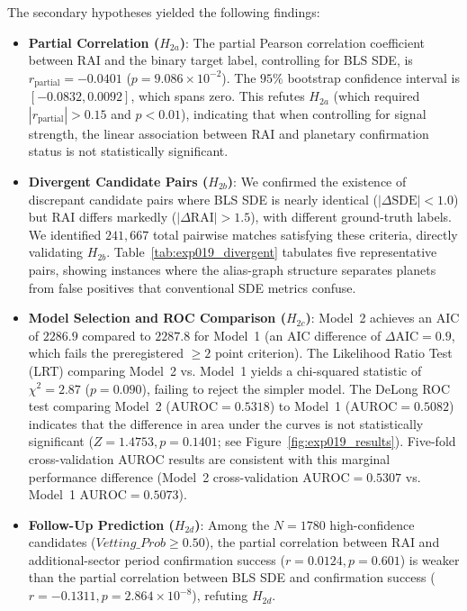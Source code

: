 The secondary hypotheses yielded the following findings:
\begin{itemize}
\item \textbf{Partial Correlation ($H_{2a}$)}: The partial Pearson correlation coefficient between RAI and the binary target label, controlling for BLS SDE, is $r_{\text{partial}} = -0.0401$ ($p = 9.086 \times 10^{-2}$). The $95\%$ bootstrap confidence interval is $[-0.0832, 0.0092]$, which spans zero. This refutes $H_{2a}$ (which required $|r_{\text{partial}}| > 0.15$ and $p < 0.01$), indicating that when controlling for signal strength, the linear association between RAI and planetary confirmation status is not statistically significant.
\item \textbf{Divergent Candidate Pairs ($H_{2b}$)}: We confirmed the existence of discrepant candidate pairs where BLS SDE is nearly identical ($|\Delta \text{SDE}| < 1.0$) but RAI differs markedly ($|\Delta \text{RAI}| > 1.5$), with different ground-truth labels. We identified $241,667$ total pairwise matches satisfying these criteria, directly validating $H_{2b}$. Table~\ref{tab:exp019_divergent} tabulates five representative pairs, showing instances where the alias-graph structure separates planets from false positives that conventional SDE metrics confuse.
\item \textbf{Model Selection and ROC Comparison ($H_{2c}$)}: Model~2 achieves an AIC of $2286.9$ compared to $2287.8$ for Model~1 (an AIC difference of $\Delta \text{AIC} = 0.9$, which fails the preregistered $\ge 2$ point criterion). The Likelihood Ratio Test (LRT) comparing Model~2 vs. Model~1 yields a chi-squared statistic of $\chi^2 = 2.87$ ($p = 0.090$), failing to reject the simpler model. The DeLong ROC test comparing Model~2 ($\text{AUROC} = 0.5318$) to Model~1 ($\text{AUROC} = 0.5082$) indicates that the difference in area under the curves is not statistically significant ($Z = 1.4753, p = 0.1401$; see Figure~\ref{fig:exp019_results}). Five-fold cross-validation AUROC results are consistent with this marginal performance difference (Model~2 cross-validation $\text{AUROC} = 0.5307$ vs. Model~1 $\text{AUROC} = 0.5073$).
\item \textbf{Follow-Up Prediction ($H_{2d}$)}: Among the $N = 1780$ high-confidence candidates ($Vetting\_Prob \ge 0.50$), the partial correlation between RAI and additional-sector period confirmation success ($r = 0.0124, p = 0.601$) is weaker than the partial correlation between BLS SDE and confirmation success ($r = -0.1311, p = 2.864 \times 10^{-8}$), refuting $H_{2d}$.
\end{itemize}

